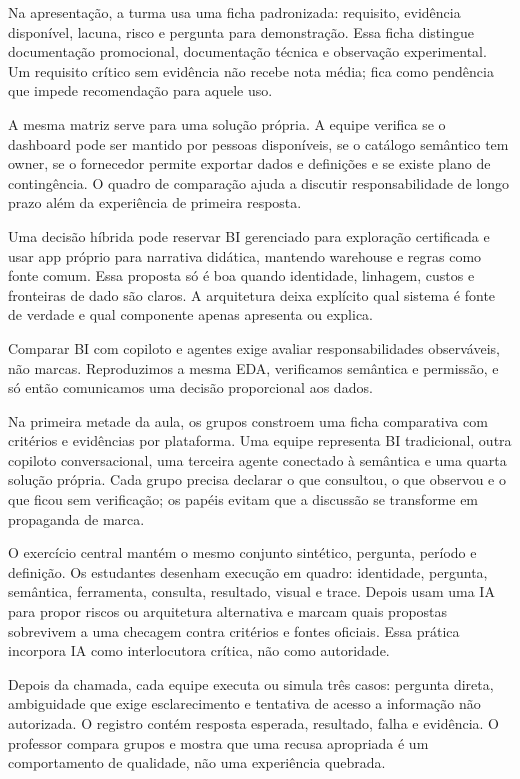 Na apresentação, a turma usa uma ficha padronizada: requisito, evidência disponível, lacuna, risco e pergunta para demonstração. Essa ficha distingue documentação promocional, documentação técnica e observação experimental. Um requisito crítico sem evidência não recebe nota média; fica como pendência que impede recomendação para aquele uso.

A mesma matriz serve para uma solução própria. A equipe verifica se o dashboard pode ser mantido por pessoas disponíveis, se o catálogo semântico tem owner, se o fornecedor permite exportar dados e definições e se existe plano de contingência. O quadro de comparação ajuda a discutir responsabilidade de longo prazo além da experiência de primeira resposta.

Uma decisão híbrida pode reservar BI gerenciado para exploração certificada e usar app próprio para narrativa didática, mantendo warehouse e regras como fonte comum. Essa proposta só é boa quando identidade, linhagem, custos e fronteiras de dado são claros. A arquitetura deixa explícito qual sistema é fonte de verdade e qual componente apenas apresenta ou explica.

\begin{SummaryBox}
Comparar BI com copiloto e agentes exige avaliar responsabilidades observáveis, não marcas. Reproduzimos a mesma EDA, verificamos semântica e permissão, e só então comunicamos uma decisão proporcional aos dados.
\end{SummaryBox}



Na primeira metade da aula, os grupos constroem uma ficha comparativa com critérios e evidências por plataforma. Uma equipe representa BI tradicional, outra copiloto conversacional, uma terceira agente conectado à semântica e uma quarta solução própria. Cada grupo precisa declarar o que consultou, o que observou e o que ficou sem verificação; os papéis evitam que a discussão se transforme em propaganda de marca.

O exercício central mantém o mesmo conjunto sintético, pergunta, período e definição. Os estudantes desenham execução em quadro: identidade, pergunta, semântica, ferramenta, consulta, resultado, visual e trace. Depois usam uma IA para propor riscos ou arquitetura alternativa e marcam quais propostas sobrevivem a uma checagem contra critérios e fontes oficiais. Essa prática incorpora IA como interlocutora crítica, não como autoridade.

Depois da chamada, cada equipe executa ou simula três casos: pergunta direta, ambiguidade que exige esclarecimento e tentativa de acesso a informação não autorizada. O registro contém resposta esperada, resultado, falha e evidência. O professor compara grupos e mostra que uma recusa apropriada é um comportamento de qualidade, não uma experiência quebrada.

